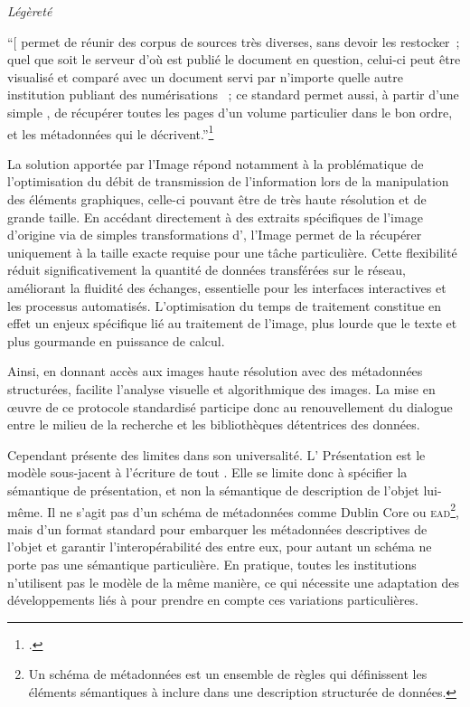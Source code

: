 \emph{Légèreté}

\begin{kwote}
``{[}\iiif{]} permet de réunir des corpus de sources très diverses, sans
devoir les restocker~; quel que soit le serveur d'où est publié le
document en question, celui-ci peut être visualisé et comparé avec un
document servi par n'importe quelle autre institution publiant des
numérisations \iiif~; ce standard permet aussi, à partir d'une simple
\uri, de récupérer toutes les pages d'un volume particulier dans le bon
ordre, et les métadonnées qui le décrivent.''\footcite[p.6]{champenois_visual_2023}
\end{kwote}   

La solution apportée par l'\api Image répond notamment à la
problématique de l'optimisation du débit de transmission de
l'information lors de la manipulation des éléments graphiques, celle-ci
pouvant être de très haute résolution et de grande taille. En accédant
directement à des extraits spécifiques de l'image d'origine via de
simples transformations d'\URL, l'\api Image permet de la récupérer
uniquement à la taille exacte requise pour une tâche particulière. Cette
flexibilité réduit significativement la quantité de données transférées
sur le réseau, améliorant la fluidité des échanges, essentielle pour les
interfaces interactives et les processus automatisés. L'optimisation du
temps de traitement constitue en effet un enjeux spécifique lié au
traitement de l'image, plus lourde que le texte et plus gourmande en
puissance de calcul.

Ainsi, en donnant accès aux images haute résolution avec des métadonnées
structurées, \iiif facilite l'analyse visuelle et algorithmique des
images. La mise en œuvre de ce protocole standardisé participe donc au
renouvellement du dialogue entre le milieu de la recherche et les
bibliothèques détentrices des données.

Cependant \iiif présente des limites dans son universalité. L'\api
Présentation est le modèle sous-jacent à l'écriture de tout
\emph{\man}. Elle se limite donc à spécifier la sémantique de
présentation, et non la sémantique de description de l'objet lui-même.
Il ne s'agit pas d'un schéma de métadonnées comme Dublin Core ou
\xml \textsc{ead}\footnote{Un schéma de métadonnées est un ensemble de règles qui
  définissent les éléments sémantiques à inclure dans une description
  structurée de données.}, mais d'un format standard pour embarquer les
métadonnées descriptives de l'objet et garantir l'interopérabilité des
\mans entre eux, pour autant un schéma ne porte pas une
sémantique particulière. En pratique, toutes les institutions
n'utilisent pas le modèle de la même manière, ce qui nécessite une
adaptation des développements liés à \iiif pour prendre en compte ces
variations particulières.

